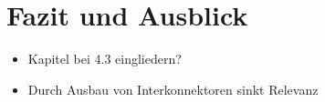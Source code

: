 \section{Fazit und Ausblick}
\label{sec:Fazit und Ausblick}
\begin{itemize}
    \item Kapitel bei 4.3 eingliedern?
    \item Durch Ausbau von Interkonnektoren sinkt Relevanz 
\end{itemize}

